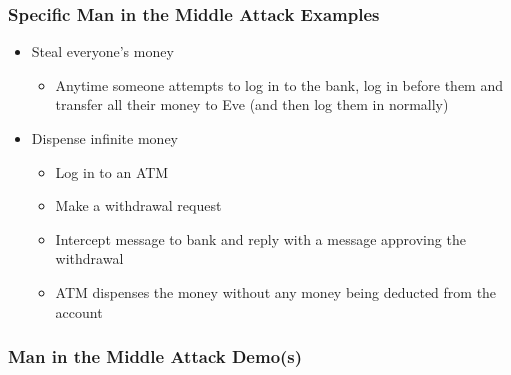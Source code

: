 \documentclass{beamer}
\begin{document}
\begin{frame}[fragile]
\frametitle{Specific Man in the Middle Attack Examples}
\begin{itemize}
\item Steal everyone's money
\begin{itemize}
\item Anytime someone attempts to log in to the bank, log in before them and transfer all their money to Eve (and then log them in normally)
\end{itemize}
\item Dispense infinite money
\begin{itemize}
\item Log in to an ATM
\item Make a withdrawal request
\item Intercept message to bank and reply with a message approving the withdrawal
\item ATM dispenses the money without any money being deducted from the account
\end{itemize}
\end{itemize}
\end{frame}

\begin{frame}[fragile]
\frametitle{Man in the Middle Attack Demo(s)}
\end{frame}
\end{document}
